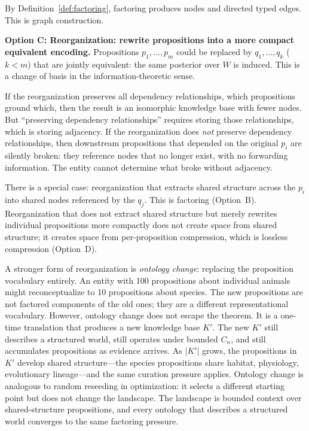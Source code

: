 \documentclass[11pt]{article}
\theoremstyle{definition}
\begin{document}
By Definition~\ref{def:factoring}, factoring produces nodes and directed
typed edges. This is graph construction.

\textbf{Option C: Reorganization: rewrite propositions into a more
compact equivalent encoding.}
Propositions $p_1, \ldots, p_m$ could be replaced by $q_1, \ldots, q_k$
($k < m$) that are jointly equivalent: the same posterior over $W$ is
induced. This is a change of basis in the information-theoretic sense.

If the reorganization preserves all dependency relationships,
which propositions ground which, then the result is an isomorphic
knowledge base with fewer nodes. But ``preserving dependency
relationships'' requires storing those relationships, which is storing
adjacency. If the reorganization does \emph{not} preserve dependency
relationships, then downstream propositions that depended on the
original $p_i$ are silently broken: they reference nodes that no longer
exist, with no forwarding information. The entity cannot determine what
broke without adjacency.

There is a special case: reorganization that extracts shared structure
across the $p_i$ into shared nodes referenced by the $q_j$. This is
factoring (Option~B). Reorganization that does not extract shared
structure but merely rewrites individual propositions more compactly
does not create space from shared structure; it creates space from
per-proposition compression, which is lossless compression (Option~D).

A stronger form of reorganization is \emph{ontology change}: replacing
the proposition vocabulary entirely. An entity with 100 propositions
about individual animals might reconceptualize to 10 propositions about
species. The new propositions are not factored components of the old
ones; they are a different representational vocabulary. However,
ontology change does not escape the theorem. It is a one-time
translation that produces a new knowledge base $K'$. The new $K'$
still describes a structured world, still operates under bounded
$C_n$, and still accumulates propositions as evidence arrives. As
$|K'|$ grows, the propositions in $K'$ develop shared structure---the
species propositions share habitat, physiology, evolutionary
lineage---and the same curation pressure applies. Ontology change is
analogous to random reseeding in optimization: it selects a different
starting point but does not change the landscape. The landscape is
bounded context over shared-structure propositions, and every
ontology that describes a structured world converges to the same
factoring pressure.
\end{document}
